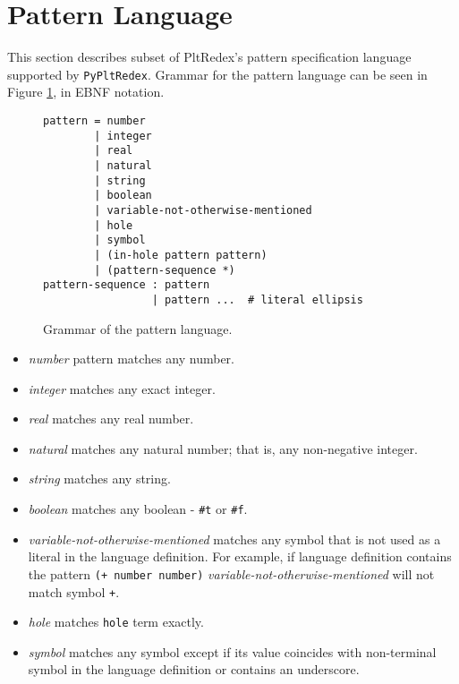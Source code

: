 \section{Pattern Language}

This section describes subset of PltRedex's pattern specification language supported by \texttt{PyPltRedex}. Grammar for the pattern language can be seen in Figure \ref{pattern-grammar}, in EBNF notation. 

\begin{figure}[h]
\begin{verbatim}
pattern = number 
		| integer 
		| real 
		| natural 
		| string 
		| boolean 
		| variable-not-otherwise-mentioned 
		| hole 
		| symbol
		| (in-hole pattern pattern)
		| (pattern-sequence *) 
pattern-sequence : pattern 
                 | pattern ...  # literal ellipsis
\end{verbatim}
\caption{Grammar of the pattern language.}
\label{pattern-grammar}
\end{figure}

\begin{itemize}
\item
\textit{number} pattern matches any number.

\item
\textit{integer} matches any exact integer. 

\item
\textit{real} matches any real number.

\item
\textit{natural} matches any natural number; that is, any non-negative integer.

\item
\textit{string} matches any string.

\item
\textit{boolean} matches any boolean - \texttt{\#t} or \texttt{\#f}.
\item
\textit{variable-not-otherwise-mentioned} matches any symbol that is not used as a literal in the language definition. For example, if language definition contains the pattern \texttt{(+ number number)} \textit{variable-not-otherwise-mentioned} will not match symbol \texttt{+}.

\item
\textit{hole} matches \texttt{hole} term exactly.

\item
\textit{symbol} matches any symbol except if its value coincides with non-terminal symbol in the language definition or contains an underscore.
\end{itemize}

